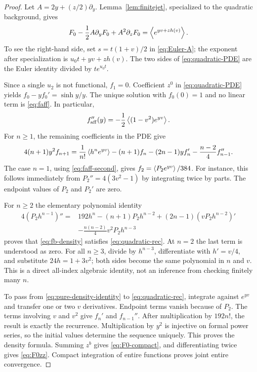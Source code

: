 \begin{proof}
Let $A=2y+(z/2)\partial_y$. Lemma~\ref{lem:finitejet}, specialized to
the quadratic background, gives
\begin{equation}\label{eq:quadratic-PDE}
 F_0-\frac12A\partial_yF_0+A^2\partial_zF_0
 =\left\langle e^{yv+zh(v)}\right\rangle.
\end{equation}
To see the right-hand side, set $s=t(1+v)/2$ in
\eqref{eq:Euler-A}; the exponent after specialization is
$u_0t+yv+zh(v)$. The two sides of \eqref{eq:quadratic-PDE} are the
Euler identity divided by $te^{u_0t}$.

Since a single $u_2$ is not functional, $f_1=0$. Coefficient $z^0$
in \eqref{eq:quadratic-PDE} yields
$f_0-yf_0'=\sinh y/y$. The unique solution with $f_0(0)=1$ and no
linear term is \eqref{eq:faff}. In particular,
\begin{equation}\label{eq:faff-second}
 f_{\mathrm{aff}}''(y)=-\frac12\left\langle (1-v^2)e^{yv}\right\rangle.
\end{equation}
For $n\ge1$, the remaining coefficients in the PDE give
\begin{equation}\label{eq:quadratic-rec}
\begin{split}
 4(n+1)y^2f_{n+1}
 =\frac1{n!}\left\langle h^ne^{yv}\right\rangle
 -(n+1)f_n-(2n-1)yf_n'
 -\frac{n-2}{4}f_{n-1}''.
\end{split}
\end{equation}
The case $n=1$, using \eqref{eq:faff-second}, gives
$f_2=\left\langle P_2e^{yv}\right\rangle/384$. For instance, this follows immediately
from $P_2''=4(3v^2-1)$ by integrating twice by parts. The endpoint
values of $P_2$ and $P_2'$ are zero.

For $n\ge2$ the elementary polynomial identity
\begin{equation}\label{eq:pure-density-identity}
\begin{split}
 4(P_2h^{n-1})''={}&192h^n-(n+1)P_2h^{n-2}
 +(2n-1)(vP_2h^{n-2})'\\
 &-\frac{n(n-2)}4v^2P_2h^{n-3}
\end{split}
\end{equation}
proves that \eqref{eq:fb-density} satisfies \eqref{eq:quadratic-rec}.
At $n=2$ the last term is understood as zero. For all $n\ge3$, divide
by $h^{n-3}$, differentiate with $h'=v/4$, and substitute
$24h=1+3v^2$; both sides become the same polynomial in $n$ and $v$.
This is a direct all-index algebraic identity, not an inference from
checking finitely many $n$.

To pass from \eqref{eq:pure-density-identity} to
\eqref{eq:quadratic-rec}, integrate against $e^{yv}$ and transfer
one or two $v$ derivatives. Endpoint terms vanish because of $P_2$.
The terms involving $v$ and $v^2$ give $f_n'$ and $f_{n-1}''$.
After multiplication by $192n!$, the result is exactly the recurrence.
Multiplication by $y^2$ is injective on formal power series, so the
initial values determine the sequence uniquely. This proves the density
formula. Summing $z^b$ gives \eqref{eq:F0-compact}, and differentiating
twice gives \eqref{eq:F0zz}. Compact integration of entire functions
proves joint entire convergence.
\end{proof}

